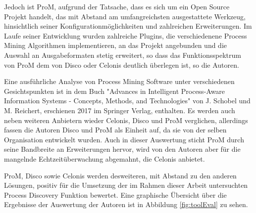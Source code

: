 \begin{table}[!h]
\centering
{}
\caption{Angaben von Anwendern zu ihrem Umgang mit Process Mining Software (Quelle: Auszug aus Tabelle 5: Fragenkatalog 5, Verstraete, Comparative Study of Process Mining Software, S. 29 \cite{compPM} }
\label{comparison}
\end{table}

Jedoch ist ProM, aufgrund der Tatsache, dass es sich um ein Open Source Projekt handelt, das mit Abstand am umfangreichsten ausgestattete Werkzeug,  hinsichtlich seiner Konfigurationmöglichkeiten und zahlreichen Erweiterungen. 
Im Laufe seiner Entwicklung wurden zahlreiche Plugins, die verschiedenene Process Mining Algorithmen implementieren, an das Projekt angebunden und die Auswahl an Ausgabeformaten stetig erweitert, so dass das Funktionsspektrum von ProM dem von Disco oder Celonis deutlich überlegen ist, so die Autoren. 

Eine ausführliche Analyse von Process Mining Software unter verschiedenen Gesichtspunkten ist in dem Buch "Advances in Intelligent Process-Aware Information Systems - Concepts, Methods, and Technologies" von J. Schobel und M.  Reichert, erschienen 2017 im Springer Verlag, enthalten\cite{Schobel2017}. Es werden auch neben weiteren Anbietern wieder Celonis, Disco und ProM verglichen, allerdings fassen die Autoren Disco und ProM als Einheit auf, da sie von der selben Organisation entwickelt wurden. Auch in dieser Auswertung sticht ProM durch seine Bandbreite an Erweiterungen hervor, wird von den Autoren aber für die mangelnde Echtzeitüberwachung abgemahnt, die Celonis anbietet.

ProM, Disco sowie Celonis werden desweiteren, mit Abstand zu den anderen Lösungen, positiv für die Umsetzung der im Rahmen dieser Arbeit untersuchten Process Discovery Funktion bewertet. Eine graphische Übersicht über die Ergebnisse der Auswertung der Autoren ist in Abbildung \ref{fig:toolEval} zu sehen.

